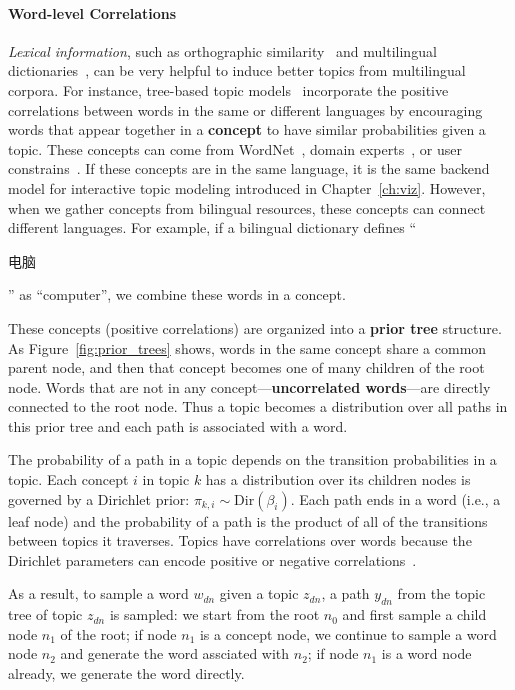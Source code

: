\paragraph{\bf Word-level Correlations}

\emph{Lexical information}, such as orthographic
similarity~\citep{boyd-graber-09} and multilingual
dictionaries~\citep{boyd-graber-10}, can be very helpful to induce
better topics from multilingual corpora. For instance, tree-based
topic models~\citep[\tlda{}]{boyd-graber-07,andrzejewski-09,hu-14:itm}
incorporate the positive correlations between words in the same or
different languages by encouraging words that appear together in a
{\bf concept} to have similar probabilities given a topic. These
concepts can come from WordNet~\citep{boyd-graber-10}, domain
experts~\citep{andrzejewski-09}, or user
constrains~\citep{hu-14:itm}. If these concepts are in the same
language, it is the same backend model for interactive topic modeling
introduced in Chapter~\ref{ch:viz}. However, when we gather concepts
from bilingual resources, these concepts can connect different
languages. For example, if a bilingual dictionary defines
``\begin{CJK*}{UTF8}{gbsn}电脑\end{CJK*}'' as ``computer'', we combine
  these words in a concept.

These concepts (positive correlations) are organized into a {\bf prior
  tree} structure. As Figure~\ref{fig:prior_trees} shows, words in the
same concept share a common parent node, and then that concept becomes
one of many children of the root node.  Words that are not in any
concept---{\bf uncorrelated words}---are directly connected to the
root node. Thus a topic becomes a distribution over all paths in this
prior tree and each path is associated with a word.

The probability of a path in a topic depends on the transition
probabilities in a topic.  Each concept $i$ in topic $k$ has a
distribution over its children nodes is governed by a Dirichlet prior:
$\pi_{k,i} \sim \text{Dir}(\beta_{i})$.  Each path ends in a word
(i.e., a leaf node) and the probability of a path is the product of
all of the transitions between topics it traverses. Topics have
correlations over words because the Dirichlet parameters can encode
positive or negative correlations~\citep{andrzejewski-09}.

As a result, to sample a word $w_{dn}$ given a topic $z_{dn}$, a path
$y_{dn}$ from the topic tree of topic $z_{dn}$ is sampled: we start
from the root $n_0$ and first sample a child node $n_1$ of the root;
if node $n_1$ is a concept node, we continue to sample a word node
$n_2$ and generate the word assciated with $n_2$; if node $n_1$ is a
word node already, we generate the word directly.

